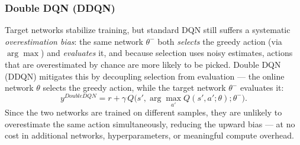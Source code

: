 \subsubsection{Double DQN (DDQN)}
Target networks stabilize training, but standard DQN still suffers a systematic \textit{overestimation bias}: the same network $\theta^-$ both \textit{selects} the greedy action (via $\arg\max$) and \textit{evaluates} it, and because selection uses noisy estimates, actions that are overestimated by chance are more likely to be picked. Double DQN (DDQN) mitigates this by decoupling selection from evaluation — the online network $\theta$ selects the greedy action, while the target network $\theta^-$ evaluates it:
\begin{equation}
    y^{DoubleDQN} = r + \gamma \, Q\big(s', \arg\max_{a'} Q(s', a'; \theta); \theta^-\big).
\end{equation}
Since the two networks are trained on different samples, they are unlikely to overestimate the same action simultaneously, reducing the upward bias — at no cost in additional networks, hyperparameters, or meaningful compute overhead.

